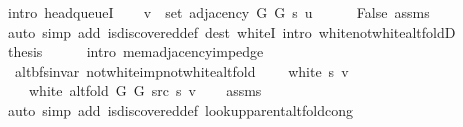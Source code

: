 \begin{isabellebody}
\ {\isacharparenleft}{\kern0pt}intro\ head{\isacharunderscore}{\kern0pt}queueI{\isacharparenright}{\kern0pt}\isanewline
\ \ \isamarkupfalse%
\ {\isachardoublequoteopen}v\ {\isasymin}\ set\ {\isacharparenleft}{\kern0pt}adjacency\ G{}\ G{}\ s\ u{\isacharparenright}{\kern0pt}{\isachardoublequoteclose}\isanewline
\ \ \ \ \isamarkupfalse%
\ False\ assms\isanewline
\ \ \ \ \isamarkupfalse%
\ {\isacharparenleft}{\kern0pt}auto\ simp\ add{\isacharcolon}{\kern0pt}\ is{\isacharunderscore}{\kern0pt}discovered{\isacharunderscore}{\kern0pt}def\ dest{\isacharcolon}{\kern0pt}\ whiteI\ intro{\isacharcolon}{\kern0pt}\ white{\isacharunderscore}{\kern0pt}not{\isacharunderscore}{\kern0pt}white{\isacharunderscore}{\kern0pt}alt{\isacharunderscore}{\kern0pt}foldD{\isacharparenleft}{\kern0pt}{}{\isacharparenright}{\kern0pt}{\isacharparenright}{\kern0pt}\isanewline
\ \ \isamarkupfalse%
\ {\isacharquery}{\kern0pt}thesis\isanewline
\ \ \ \ \isamarkupfalse%
\ {\isacharparenleft}{\kern0pt}intro\ mem{\isacharunderscore}{\kern0pt}adjacency{\isacharunderscore}{\kern0pt}imp{\isacharunderscore}{\kern0pt}edge{\isacharparenright}{\kern0pt}\isanewline
{}\isamarkupfalse%
%
\endisatagproof
{\isafoldproof}%
%
\isadelimproof
\isanewline
%
\endisadelimproof
%
\isadeliminvisible
\isanewline
%
\endisadeliminvisible
%
\isataginvisible
{}\isamarkupfalse%
\ {\isacharparenleft}{\kern0pt}\ alt{\isacharunderscore}{\kern0pt}bfs{\isacharunderscore}{\kern0pt}invar{\isacharparenright}{\kern0pt}\ not{\isacharunderscore}{\kern0pt}white{\isacharunderscore}{\kern0pt}imp{\isacharunderscore}{\kern0pt}not{\isacharunderscore}{\kern0pt}white{\isacharunderscore}{\kern0pt}alt{\isacharunderscore}{\kern0pt}fold{\isacharcolon}{\kern0pt}\isanewline
\ \ \ {\isachardoublequoteopen}{\isasymnot}\ white\ s\ v{\isachardoublequoteclose}\isanewline
\ \ \ {\isachardoublequoteopen}{\isasymnot}\ white\ {\isacharparenleft}{\kern0pt}alt{\isacharunderscore}{\kern0pt}fold\ G{}\ G{}\ src\ s{\isacharparenright}{\kern0pt}\ v{\isachardoublequoteclose}%
\endisataginvisible
{\isafoldinvisible}%
%
\isadeliminvisible
\isanewline
%
\endisadeliminvisible
%
\isadelimproof
\ \ %
\endisadelimproof
%
\isatagproof
{}\isamarkupfalse%
\ assms\isanewline
\ \ \isamarkupfalse%
\ {\isacharparenleft}{\kern0pt}auto\ simp\ add{\isacharcolon}{\kern0pt}\ is{\isacharunderscore}{\kern0pt}discovered{\isacharunderscore}{\kern0pt}def\ lookup{\isacharunderscore}{\kern0pt}parent{\isacharunderscore}{\kern0pt}alt{\isacharunderscore}{\kern0pt}fold{\isacharunderscore}{\kern0pt}cong{\isacharparenright}{\kern0pt}%

\end{isabellebody}
